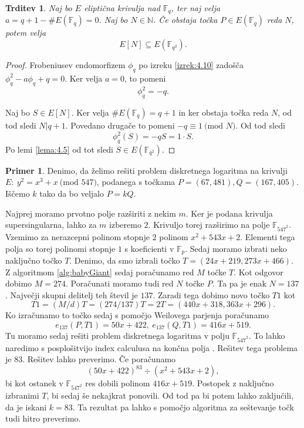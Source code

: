 \documentclass[12pt,a4paper,twoside]{article}
\theoremstyle{definition} %
\newtheorem{primer}[definicija]{Primer}
\theoremstyle{plain} %
\newtheorem{trditev}[definicija]{Trditev}
\numberwithin{equation}{section}  %
\newcommand{\N}{\mathbb N}
\newcommand{\F}{\mathbb F}
\newcommand{\E}[1]{E({#1})}
\newcommand{\MOD}[1]{\ \text{(mod }{#1}\text{)}}
\begin{document}
\begin{trditev}
Naj bo $E$ eliptična krivulja nad $\F_q$, ter naj velja $a = q+1-\#\E{\F_q} =0$. Naj bo $N\in \N$. Če obstaja točka $P \in \E{\F_q}$ reda $N$, potem velja
$$E[N] \subseteq \E{\F_{q^2}}.$$
\end{trditev}

\begin{proof}
 Frobeniusev endomorfizem $\phi_q$ po izreku \ref{izrek:4.10} zadošča $\phi^2_q-a\phi_q+q=0$. Ker velja $a = 0$, to pomeni
$$\phi^2_q = -q.$$

Naj bo $S \in E[N]$. Ker velja $\#\E{\F_q} = q+1$ in ker obstaja točka reda $N$, od tod sledi $N|q+1$. Povedano drugače to pomeni $-q \equiv 1 \MOD{N}$. Od tod sledi
$$\phi^2_q(S) = -qS = 1\cdot S.$$
Po lemi \ref{lema:4.5} od tot sledi $S \in \E{\F_{q^2}}$. 
\end{proof}

\begin{primer}
Denimo, da želimo rešiti problem diskretnega logaritma na krivulji $E: \ y^2 = x^3+x \MOD{547}$, podanega s točkama $P=(67,481),Q = (167,405)$. Iščemo $k$ tako da bo veljalo $P = kQ$.

Najprej moramo prvotno polje razširiti z nekim $m$. Ker je podana krivulja supersingularna, lahko za $m$ izberemo $2$. Krivuljo torej razširimo na polje $\F_{547^2}$. Vzemimo za nerazcepni polinom stopnje $2$ polinom $x^2+543x+2$. Elementi tega polja so torej polinomi stopnje $1$ s koeficienti v $\F_p$.
Sedaj moramo izbrati neko naključno točko $T$. Denimo, da smo izbrali točko $T = (24x+219,273x+466)$. Z algoritmom \ref{alg:babyGiant} sedaj poračunamo red $M$ točke $T$. Kot odgovor dobimo $M = 274$. Poračunati moramo tudi red $N$ točke $P$. Ta pa je enak $N = 137$. Največji skupni delitelj teh števil je $137$. Zaradi tega dobimo novo točko $T1$ kot 
$$T1 = (M/d) T = (274/137)T = 2T = (440x+318,363x+296).$$
Ko izračunamo to točko sedaj s pomočjo Weilovega parjenja poračunamo
$$e_{137}(P,T1) = 50x+422, \ e_{137}(Q,T1) = 416x+519.$$
Tu moramo sedaj rešiti problem diskretnega logaritma v polju $\F_{547^2}$. To lahko naredimo s posplošitvijo index calculusa na končna polja \cite{Henri2005}. Rešitev tega problema je $83$. Rešitev lahko preverimo.
Če poračunamo
$$(50x+422)^{83} \div (x^2+543x+2),$$
bi kot ostanek v $\F_{547^2}$ res dobili polinom $416x+519$.
Postopek z naključno izbranimi $T$, bi sedaj še nekajkrat ponovili. Od tod pa bi potem lahko zaključili, da je iskani $k=83$. Ta rezultat pa lahko s pomočjo algoritma za seštevanje točk tudi hitro preverimo.
\end{primer}
\end{document}

